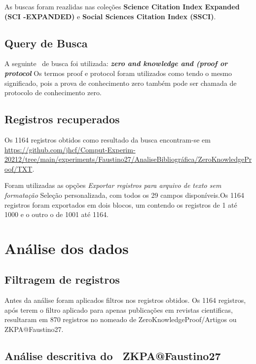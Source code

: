 As buscas foram reazlidas nas coleções \textbf{Science  Citation  Index  Expanded (SCI -EXPANDED)} e \textbf{Social  Sciences  Citation  Index (SSCI)}.

\subsection{Query de Busca}
A seguinte \querry\ de busca foi utilizada:
\textit{\textbf{zero and knowledge and (proof or protocol}}
Os termos proof e protocol foram utilizados como tendo o mesmo significado, pois a prova de conhecimento zero também pode ser chamada de protocolo de conhecimento zero.

\subsection{Registros recuperados}

Os 1164 registros obtidos como resultado da busca encontram-se em \url{https://github.com/jhcf/Comput-Experim-20212/tree/main/experiments/Faustino27/AnaliseBibliográfica/ZeroKnowledgeProof/TXT}.

Foram utilizadas as opções \textit{Exportar registros para arquivo de texto sem formatação} Seleção personalizada, com todos os 29 campos disponíveis.Os 1164 registros foram exportados em dois blocos, um contendo os registros de 1 até 1000 e o outro o de 1001 até 1164.

\section{Análise dos dados}

\subsection{Filtragem de registros}

Antes da análise foram aplicados filtros nos registros obtidos. Os 1164 registros, após terem o filtro aplicado para apenas publicações em revistas cientificas, resultaram em 870 registros no \dataset nomeado de ZeroKnowledgeProof/Artigos ou ZKPA@Faustino27.

\subsection{Análise descritiva do \dataset\   ZKPA@Faustino27}

